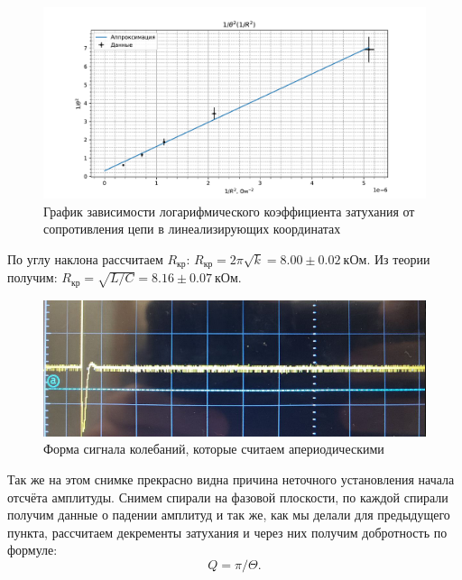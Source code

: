 \documentclass[a4paper,12pt]{extarticle}
\begin{document}
\begin{figure}[h!]
    \centering
    \includegraphics[width=\textwidth]{th(r).pdf}
    \caption{График зависимости логарифмического коэффициента затухания от сопротивления цепи в линеализирующих координатах}
\end{figure}

По углу наклона рассчитаем $R_\text{кр}$: $R_\text{кр} = 2 \pi \sqrt{k} = 8.00 \pm 0.02 \ \text{кОм}.$ Из теории получим: $R_\text{кр} = \sqrt{L/C} = 8.16 \pm 0.07 \ \text{кОм}$.

\begin{figure}[h!]
    \centering
    \includegraphics[width=0.8\linewidth]{aperiod.png}
    \caption{Форма сигнала колебаний, которые считаем апериодическими}
\end{figure}
Так же на этом снимке прекрасно видна причина неточного установления начала отсчёта амплитуды.
Снимем спирали на фазовой плоскости, по каждой спирали получим данные о падении амплитуд и так же, как мы делали для предыдущего пункта, рассчитаем декременты затухания и через них получим добротность по формуле:
\begin{equation}
    Q = \pi / \Theta.
\end{equation}
\end{document}

